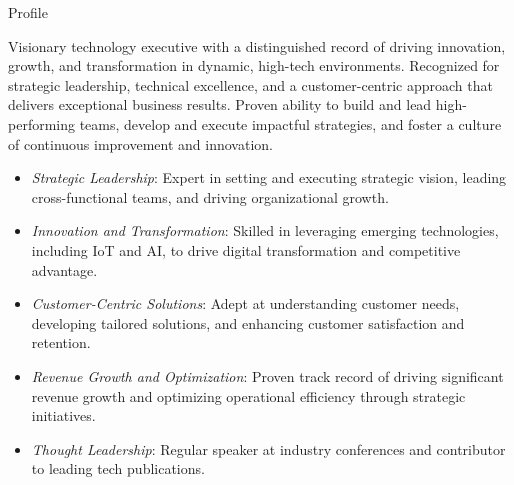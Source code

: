 \documentclass{resume} %
\begin{document}
\vspace{-1em}
\begin{rSection}{Profile}
  
  Visionary technology executive with a distinguished record of driving innovation, growth, and transformation in dynamic, high-tech environments. Recognized for strategic leadership, technical excellence, and a customer-centric approach that delivers exceptional business results. Proven ability to build and lead high-performing teams, develop and execute impactful strategies, and foster a culture of continuous improvement and innovation.

  \begin{itemize}
    \setlength\itemsep{-0.5em}
    \item \textit{Strategic Leadership}: Expert in setting and executing strategic vision, leading cross-functional teams, and driving organizational growth.
    \item \textit{Innovation and Transformation}: Skilled in leveraging emerging technologies, including IoT and AI, to drive digital transformation and competitive advantage.
    \item \textit{Customer-Centric Solutions}: Adept at understanding customer needs, developing tailored solutions, and enhancing customer satisfaction and retention.
    \item \textit{Revenue Growth and Optimization}: Proven track record of driving significant revenue growth and optimizing operational efficiency through strategic initiatives.
    \item \textit{Thought Leadership}: Regular speaker at industry conferences and contributor to leading tech publications.
  \end{itemize}
  
\end{rSection}


\end{document}

